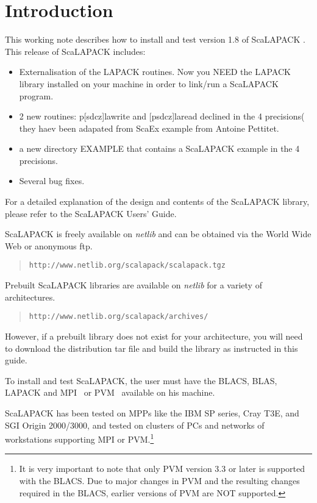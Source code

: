 \documentclass[11pt]{report}
\newcommand{\dent}{\hspace*{\parindent}}
\begin{document}
\newpage

\tableofcontents

\newpage

\section{Introduction}

\vspace{0.25in}

\dent
This working note describes how to install and test
version 1.8 of ScaLAPACK \cite{slug}.
This release of ScaLAPACK includes:
\begin{itemize}
\item Externalisation of the LAPACK routines. Now you NEED the LAPACK library installed on your machine in order to link/run a ScaLAPACK program. 
\item 2 new routines: p[sdcz]lawrite and [psdcz]laread declined in the 4 precisions( they haev been adapated from ScaEx example from Antoine Pettitet.
\item a new directory EXAMPLE that contains a ScaLAPACK example in the 4 precisions.
\item Several bug fixes.
\end{itemize}
For a detailed explanation of the design and contents of the ScaLAPACK library,
please refer to the ScaLAPACK Users' Guide\cite{slug}.

ScaLAPACK is freely available on {\em netlib} and
can be obtained via the World Wide Web or anonymous ftp.
\begin{quote} 
{\tt http://www.netlib.org/scalapack/scalapack.tgz}
\end{quote}
Prebuilt ScaLAPACK libraries are available on {\em netlib} for a variety
of architectures.
\begin{quote} 
{\tt http://www.netlib.org/scalapack/archives/}
\end{quote}
However, if a prebuilt library does not exist
for your architecture, you will need to download the distribution tar
file and build the library as instructed in this guide.

To install and test ScaLAPACK, the user must have the 
BLACS, BLAS\cite{blas1,blas2,blas3}, LAPACK\cite{lapack} and
MPI~\cite{mpi} or PVM~\cite{pvm} available on his machine.

ScaLAPACK has been tested on MPPs like the IBM SP series, Cray T3E,
and SGI Origin 2000/3000, and tested on clusters of PCs and networks of 
 workstations supporting
MPI or PVM.\footnote{It is very important to note that only PVM version
3.3 or later is supported with the BLACS\cite{lawn94,lawn73}.  Due to
major changes
in PVM and the resulting changes required in the BLACS,
earlier versions of PVM are NOT supported.}
\end{document}
